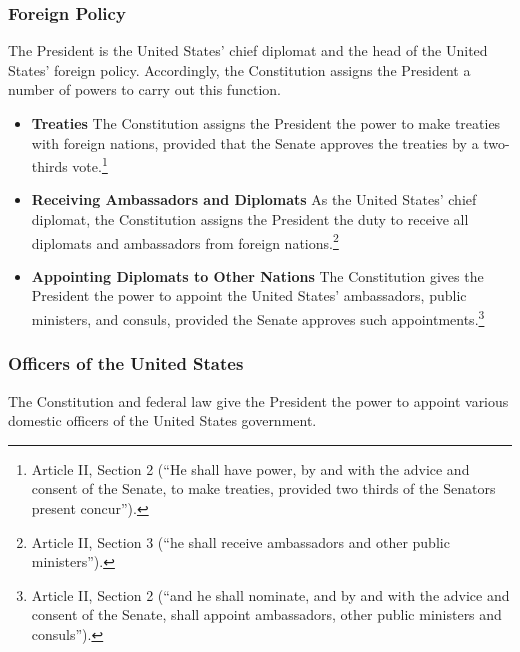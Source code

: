 \subsubsection{Foreign Policy}
The President is the United States' chief diplomat and the head of the United States' foreign policy.
Accordingly, the Constitution assigns the President a number of powers to carry out this function.

\begin{itemize}

\item \textbf{Treaties} The Constitution assigns the President the power to make treaties with foreign nations, provided that the Senate approves the treaties by a two-thirds vote.\footnote{Article II, Section 2 (``He shall have power, by and with the advice and consent of the Senate, to make treaties, provided two thirds of the Senators present concur'').}

\item \textbf{Receiving Ambassadors and Diplomats} As the United States' chief diplomat, the Constitution assigns the President the duty to receive all diplomats and ambassadors from foreign nations.\footnote{Article II, Section 3 (``he shall receive ambassadors and other public ministers'').}

\item \textbf{Appointing Diplomats to Other Nations}
The Constitution gives the President the power to appoint the United States' ambassadors, public ministers, and consuls, provided the Senate approves such appointments.\footnote{Article II, Section 2 (``and he shall nominate, and by and with the advice and consent of the Senate, shall appoint ambassadors, other public ministers and consuls'').}

\end{itemize}

\subsubsection{Officers of the United States}
The Constitution and federal law give the President the power to appoint various domestic officers of the United States government.

